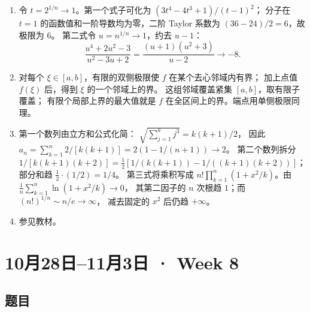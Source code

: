 \documentclass[UTF8,11pt, a4paper, oneside, fontset=none]{ctexbook}
\begin{document}
\begin{enumerate}
逐次展开，便得到题目所列嵌套根式的 Vi\`ete 公式。
\item 令 $t=2^{1/n}\to1$。第一个式子可化为
$(3t^4-4t^3+1)/(t-1)^2$；
分子在 $t=1$ 的函数值和一阶导数均为零，二阶 Taylor 系数为
$(36-24)/2=6$，故极限为 $6$。
第二式令 $u=n^{1/n}\to1$，约去 $u-1$：
\[
\frac{u^4+2u^2-3}{u^2-3u+2}
=\frac{(u+1)(u^2+3)}{u-2}\longrightarrow-8.
\]
\item 对每个 $\xi\in[a,b]$，有限的双侧极限使 $f$ 在某个去心邻域内有界；
加上点值 $f(\xi)$ 后，得到 $\xi$ 的一个邻域上的界。
这组邻域覆盖紧集 $[a,b]$，取有限子覆盖；
有限个局部上界的最大值就是 $f$ 在全区间上的界。端点用单侧极限同理。
\item 第一个数列由立方和公式化简：
$\sqrt{\sum_{j=1}^k j^3}=k(k+1)/2$，
因此 $a_n=\sum_{k=1}^n2/[k(k+1)]=2(1-1/(n+1))\to2$。
第二个数列拆分
$1/[k(k+1)(k+2)]
=\tfrac12[1/(k(k+1))-1/((k+1)(k+2))]$；
部分和趋 $\tfrac12\cdot(1/2)=1/4$。
第三式将乘积写成
$n!\prod_{k=1}^n(1+x^2/k)$。由
$\frac1n\sum_{k=1}^n\ln(1+x^2/k)\to0$，
其第二因子的 $n$ 次根趋 $1$；而 $(n!)^{1/n}\sim n/e\to\infty$，
减去固定的 $x^2$ 后仍趋 $+\infty$。
\item 参见教材。
\end{enumerate}

\clearpage

\section{10月28日--11月3日 · Week 8}

\subsection*{题目}
\end{document}
